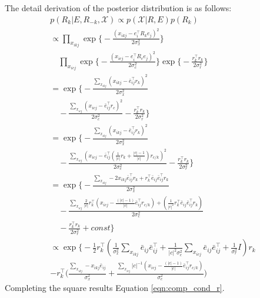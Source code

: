 The detail derivation of the posterior distribution is as follows:
\begin{align*}
&p(R_k | E, R_{-k}, \mathcal{X}) \propto p(\mathcal{X} | R, E)p(R_k)&\\
&\propto \prod_{x_{ikj}}\exp\bigg\{-\frac{(x_{ikj} - e_i^\top R_k e_j)^2}{2\sigma_x^2}\bigg\} &\\
& \quad\prod_{x_{icj}} \exp\bigg\{-\frac{(x_{icj} - e_i^\top R_c e_j)^2}{2\sigma_c^2}\bigg\} \exp\bigg\{-\frac{r_k^\top r_k}{2\sigma_r^2}\bigg\}&\\
&= \exp\bigg\{-\frac{\sum_{x_{ikj}}(x_{ikj} - \bar{e}_{ij}^\top r_k)^2}{2\sigma_x^2} &\\
&\quad- \frac{\sum_{x_{icj}}(x_{icj} - \bar{e}_{ij}^\top r_c)^2}{2\sigma_c^2} -\frac{r_k^\top r_k}{2\sigma_r^2} \bigg\}&\\
&= \exp\bigg\{-\frac{\sum_{x_{ikj}}(x_{ikj} - \bar{e}_{ij}^\top r_k)^2}{2\sigma_x^2} &\\ 
&\quad-\frac{\sum_{x_{icj}}(x_{icj} - \bar{e}_{ij}^\top (\frac{1}{|c|}r_k + \frac{|c|-1}{|c|})r_{c/k})^2}{2\sigma_c^2} -\frac{r_k^\top r_k}{2\sigma_r^2} \bigg\}&\\
&= \exp\bigg\{ -\frac{\sum_{x_{ikj}}- 2 x_{ikj} \bar{e}_{ij}^\top r_k + r_k^\top \bar{e}_{ij} \bar{e}_{ij}^\top r_k }{2\sigma_x^2} &\\
&\quad-\frac{\sum_{x_{icj}} \frac{2}{|c|} r_k ^\top (x_{icj} - \frac{(|c|-1)}{|c|} \bar{e}_{ij}^\top r_{c/k}) + (\frac{1}{|c|^2}r_k^\top \bar{e}_{ij} \bar{e}_{ij}^\top r_k)}{2\sigma_c^2} &\\
&\quad-\frac{r_k^\top r_k}{2\sigma_r^2} + const \bigg\}&\\
&\propto \exp\bigg\{ - \frac{1}{2}r_k^\top(\frac{1}{\sigma_x^2}\sum_{x_{ikj}} \bar{e}_{ij}\bar{e}_{ij}^\top + \frac{1}{|c|^2\sigma_c^2}\sum_{x_{icj}} \bar{e}_{ij}\bar{e}_{ij}^\top + \frac{1}{\sigma_r^2}I) r_k  &\\
&- r_k^\top \Big(\frac{\sum_{x_{ikj}}-x_{ikj}\bar{e}_{ij}}{\sigma_x^2} + \frac{\sum_{x_{icj}} |c|^{-1} (x_{icj} - \frac{(|c|-1)}{|c|} \bar{e}_{ij}^\top r_{c/k})}{\sigma_c^2} \Big)&
\end{align*}
Completing the square results Equation \ref{eqn:comp_cond_r}.

